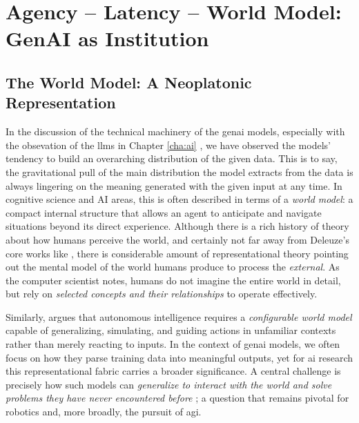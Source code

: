 \chapter{Agency – Latency – World Model: GenAI as Institution}

\section{The World Model: A Neoplatonic Representation}
In the discussion of the technical machinery of the \gls{genai} models,
especially with the obsevation of the \glspl{llm} in Chapter \ref{cha:ai}
, we have observed the models' tendency to build an overarching distribution of
the given data. This is to say, the gravitational pull of the main distribution
the model extracts from the data is always lingering on the meaning generated
with the given input at any time. In cognitive science and AI areas, this is often described in terms of a
\emph{world model}: a compact internal structure that allows an agent
to anticipate and navigate situations beyond its direct experience. Although there is a rich history of theory
about how humans perceive the world, and certainly not far away from Deleuze's
core works like , there is considerable amount of
representational theory pointing out the mental model of the world humans
produce to process the \textit{external}. As the computer scientist
\citeauthor{forrester1971} \parencite*{forrester1971}  notes, humans do not imagine the entire
world in detail, but rely on \emph{selected concepts and their
	relationships} to operate effectively.


Similarly, \textcite{lecun2022} argues that autonomous intelligence
requires a \emph{configurable world model} capable of
generalizing, simulating, and guiding actions in unfamiliar contexts
rather than merely reacting to inputs. In the context of
\gls{genai} models, we often focus on how they parse training data
into meaningful outputs, yet for \gls{ai} research this
representational fabric carries a broader significance. A central
challenge is precisely how such models can \emph{generalize to interact
	with the world and solve problems they have never encountered before}
\parencite{lecun2022}; a question that remains pivotal for robotics and,
more broadly, the pursuit of \gls{agi}.





